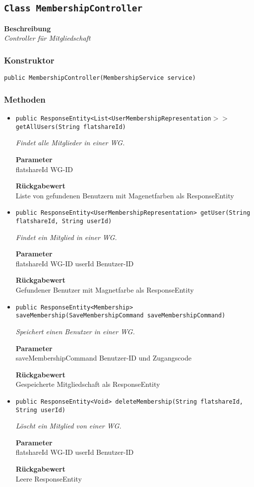     \subsection{\texttt{Class MembershipController}}
    \textbf{Beschreibung} \\
    \textit{Controller für Mitgliedschaft}
    \subsubsection*{Konstruktor}
    \texttt{public MembershipController(MembershipService service)}
    \subsubsection*{Methoden}
    \begin{itemize}
    	\item{\texttt{public ResponseEntity<List<UserMembershipRepresentation$>>$ getAllUsers(String flatshareId)}}
    	
    	\textit{Findet alle Mitglieder in einer WG.}
    	
    	\textbf{Parameter} \\
    	flatshareId WG-ID
    	
    	\textbf{Rückgabewert} \\
    	Liste von gefundenen Benutzern mit Magenetfarben als ResponseEntity        \item{\texttt{public ResponseEntity<UserMembershipRepresentation> getUser(String flatshareId, String userId)}}
    	
    	\textit{Findet ein Mitglied in einer WG.}
    	
    	\textbf{Parameter} \\
    	flatshareId WG-ID
    	userId Benutzer-ID
    	
    	\textbf{Rückgabewert} \\
    	Gefundener Benutzer mit Magnetfarbe als ResponseEntity        \item{\texttt{public ResponseEntity<Membership> saveMembership(SaveMembershipCommand saveMembershipCommand)}}
    	
    	\textit{Speichert einen Benutzer in einer WG.}
    	
    	\textbf{Parameter} \\
    	saveMembershipCommand Benutzer-ID und Zugangscode
    	
    	\textbf{Rückgabewert} \\
    	Gespeicherte Mitgliedschaft als ResponseEntity        \item{\texttt{public ResponseEntity<Void> deleteMembership(String flatshareId, String userId)}}
    	
    	\textit{Löscht ein Mitglied von einer WG.}
    	
    	\textbf{Parameter} \\
    	flatshareId WG-ID
    	userId Benutzer-ID
    	
    	\textbf{Rückgabewert} \\
    	Leere ResponseEntity
    \end{itemize}
